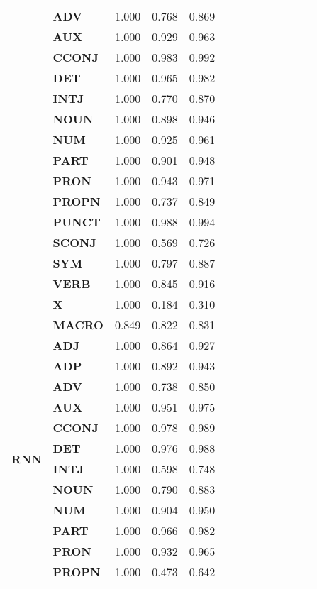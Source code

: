 \begin{longtable}{|l||l||l||l||l||l||l||l||l||l||l||l||l|}
\textbf{} & \textbf{ADV} & 1.000 & 0.768 & 0.869 \\
\textbf{} & \textbf{AUX} & 1.000 & 0.929 & 0.963 \\
\textbf{} & \textbf{CCONJ} & 1.000 & 0.983 & 0.992 \\
\textbf{} & \textbf{DET} & 1.000 & 0.965 & 0.982 \\
\textbf{} & \textbf{INTJ} & 1.000 & 0.770 & 0.870 \\
\textbf{} & \textbf{NOUN} & 1.000 & 0.898 & 0.946 \\
\textbf{} & \textbf{NUM} & 1.000 & 0.925 & 0.961 \\
\textbf{} & \textbf{PART} & 1.000 & 0.901 & 0.948 \\
\textbf{} & \textbf{PRON} & 1.000 & 0.943 & 0.971 \\
\textbf{} & \textbf{PROPN} & 1.000 & 0.737 & 0.849 \\
\textbf{} & \textbf{PUNCT} & 1.000 & 0.988 & 0.994 \\
\textbf{} & \textbf{SCONJ} & 1.000 & 0.569 & 0.726 \\
\textbf{} & \textbf{SYM} & 1.000 & 0.797 & 0.887 \\
\textbf{} & \textbf{VERB} & 1.000 & 0.845 & 0.916 \\
\textbf{} & \textbf{X} & 1.000 & 0.184 & 0.310 \\
\textbf{} & \textbf{MACRO} & 0.849 & 0.822 & 0.831 \\
\cline{1-5}
\multirow[t]{18}{*}{\textbf{RNN}} & \textbf{ADJ} & 1.000 & 0.864 & 0.927 \\
\textbf{} & \textbf{ADP} & 1.000 & 0.892 & 0.943 \\
\textbf{} & \textbf{ADV} & 1.000 & 0.738 & 0.850 \\
\textbf{} & \textbf{AUX} & 1.000 & 0.951 & 0.975 \\
\textbf{} & \textbf{CCONJ} & 1.000 & 0.978 & 0.989 \\
\textbf{} & \textbf{DET} & 1.000 & 0.976 & 0.988 \\
\textbf{} & \textbf{INTJ} & 1.000 & 0.598 & 0.748 \\
\textbf{} & \textbf{NOUN} & 1.000 & 0.790 & 0.883 \\
\textbf{} & \textbf{NUM} & 1.000 & 0.904 & 0.950 \\
\textbf{} & \textbf{PART} & 1.000 & 0.966 & 0.982 \\
\textbf{} & \textbf{PRON} & 1.000 & 0.932 & 0.965 \\
\textbf{} & \textbf{PROPN} & 1.000 & 0.473 & 0.642 \\

\end{longtable}
